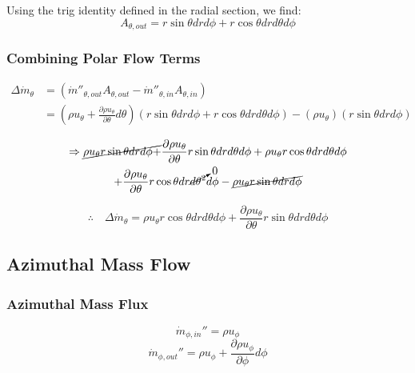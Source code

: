 \documentclass[12pt, letterpaper, twoside]{article}
\begin{document}
            Using the trig identity defined in the radial section, we find:
            \begin{equation}\label{eq:Athetaout_final}
                A_{\theta,out} = r\sin\theta dr d\phi + r\cos\theta dr d\theta d\phi
            \end{equation}

        \subsubsection{Combining Polar Flow Terms}
            \begin{equation*}
            \begin{split}
                \Delta\dot{m}_{\theta} & = (\dot{m}''_{\theta,out} A_{\theta,out} - \dot{m}''_{\theta,in} A_{\theta,in}) \\
                & = \left( \rho u_{\theta}  + \frac{\partial \rho u_{\theta}}{\partial \theta} d\theta \right) 
               \left(r\sin\theta dr d\phi + r\cos\theta dr d\theta d\phi\right) - 
               \left(\rho u_{\theta}\right) \left(r\sin\theta dr d\phi\right)
            \end{split}
            \end{equation*}

            \begin{multline*}
                \Rightarrow
                \cancel{\rho u_{\theta}r\sin\theta dr d\phi +} 
                \frac{\partial\rho u_{\theta}}{\partial\theta} r\sin\theta dr d\theta d\phi +
                \rho u_{\theta} r\cos\theta dr d\theta d\phi \\ + 
                \frac{\partial\rho u_{\theta}}{\partial\theta} r\cos\theta dr \cancelto{0}{d\theta^2} d\phi -
                \cancel{\rho u_{\theta}r\sin\theta dr d\phi}
            \end{multline*}

            \begin{equation}\label{eq:mdottheta}
                \therefore \quad \boxed{\Delta\dot{m}_{\theta} = 
                \rho u_{\theta} r\cos\theta dr d\theta d\phi + 
                \frac{\partial\rho u_{\theta}}{\partial\theta} r\sin\theta dr d\theta d\phi}
            \end{equation}
        
    \subsection{Azimuthal Mass Flow}
        \subsubsection{Azimuthal Mass Flux}
            \begin{equation}
                \dot{m}_{\phi,in}'' = \rho u_{\phi}
            \end{equation}
            \begin{equation}
                \dot{m}_{\phi,out}'' = \rho u_{\phi}  +
                \frac{\partial \rho u_{\phi}}{\partial \phi} d\phi
            \end{equation}
\end{document}
